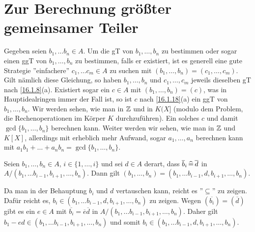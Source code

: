 \documentclass[../../main.tex]{subfiles}
\begin{document}
\section{Zur Berechnung größter gemeinsamer Teiler}

Gegeben seien $b_1,\ldots b_n\in A$. Um die gT von $b_1,\ldots ,b_n$ zu bestimmen oder sogar einen ggT von $b_1,\ldots ,b_n$ zu bestimmen, falls er existiert, ist es generell eine gute Strategie ''einfachere'' $c_1,\ldots c_m\in A$ zu suchen mit $(b_1,\ldots ,b_n)=(c_1,\ldots ,c_m)$.
Gilt nämlich diese Gleichung, so haben $b_1,\ldots ,b_n$ und $c_1,\ldots ,c_m$ jeweils dieselben gT nach \ref{16.1.8}(a). Existiert sogar ein $c\in A$ mit $(b_1,\ldots ,b_n)=(c)$, was in Hauptidealringen immer der Fall ist, so ist $c$ nach \ref{16.1.18}(a) ein ggT von $b_1,\ldots ,b_n$. Wir werden sehen, wie man in $\mathbb Z$ und in $K(X]$ (modulo dem Problem, die Rechenoperationen im Körper $K$ durchzuführen). Ein solches $c$ und damit $\gcd\{b_1,\ldots ,b_n\}$ berechnen kann. Weiter werden wir sehen, wie man in $\mathbb Z$ und $K[X]$, allerdings mit erheblich mehr Aufwand, sogar $a_1,\ldots ,a_n$ berechnen kann mit $a_1b_1+\ldots +a_nb_n=\gcd\{b_1,\ldots ,b_n\}$.

\begin{sat}\label{16.3.1}
Seien $b_1,\ldots ,b_n\in A$, $i\in\{1,\ldots ,i\}$ und sei $d\in A$ derart, dass $\overline b_i\,\widehat{=}\, \overline d$ in $A/(b_1,\ldots b_{i-1},b_{i+1},\ldots ,b_n)$. Dann gilt $(b_1,\ldots ,b_n)=(b_1,\ldots b_{i-1},d,b_{i+1},\ldots ,b_n)$.
\end{sat}
\begin{cproof}
Da man in der Behauptung $b_i$ und $d$ vertauschen kann, reicht es ''$\subseteq$'' zu zeigen. Dafür reicht es, $b_i\in (b_1,\ldots b_{i-1},d,b_{i+1},\ldots ,b_n)$ zu zeigen. Wegen $(\overline{b_i})=(\overline{d})$ gibt es ein $e\in A$ mit $\overline{b_i}=\overline{e}\overline{d}$ in $A/(b_1,\ldots b_{i-1},b_{i+1},\ldots ,b_n)$. Daher gilt $b_1-ed\in (b_1,\ldots b_{i-1},b_{i+1},\ldots ,b_n)$ und somit $b_i\in (b_1,\ldots b_{i-1},d,b_{i+1},\ldots ,b_n)$.
\end{cproof}
\end{document}
